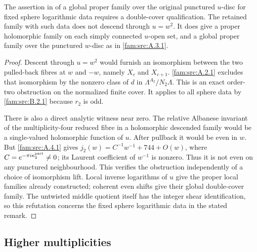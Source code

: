 \begin{proposition}\label{fam:src:B.2.3}\label{fam:st:B.2.3}
The assertion in \cite[Remark 8.1]{Engel2026} of a global proper family over the original punctured $u$-disc for fixed sphere logarithmic data requires a double-cover qualification. The retained family with such data does not descend through $u=w^2$. It does give a proper holomorphic family on each simply connected $u$-open set, and a global proper family over the punctured $w$-disc as in \ref{fam:src:A.3.1}.
\end{proposition}

\begin{proof}
Descent through $u=w^2$ would furnish an isomorphism between the two pulled-back fibres at $w$ and $-w$, namely $X_c$ and $X_{c+1}$. \ref{fam:src:A.2.1} excludes that isomorphism by the nonzero class of $d$ in $\Lambda^{A_2}/N_2\Lambda$. This is an exact order-two obstruction on the normalized finite cover. It applies to all sphere data by \ref{fam:src:B.2.1} because $r_2$ is odd.

There is also a direct analytic witness near zero. The relative Albanese invariant of the multiplicity-four reduced fibre in a holomorphic descended family would be a single-valued holomorphic function of $u$. After pullback it would be even in $w$. But \ref{fam:src:A.4.1} gives $j_2(w)=C^{-1}w^{-1}+744+O(w)$, where $C=e^{-\pi i\kappa_2^{\rm part}}\ne0$; its Laurent coefficient of $w^{-1}$ is nonzero. Thus it is not even on any punctured neighbourhood. This verifies the obstruction independently of a choice of isomorphism lift. Local inverse logarithms of $u$ give the proper local families already constructed; coherent even shifts give their global double-cover family. The untwisted middle quotient itself has the integer shear identification, so this refutation concerns the fixed sphere logarithmic data in the stated remark.
\end{proof}

\subsection{Higher multiplicities}\label{fam:section:B.3}

